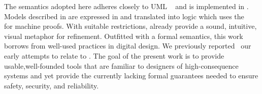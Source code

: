 The semantics adopted here adheres closely to UML \Statecharts~\cite{Alexandre} and is implemented in \iUMLB.
 Models described in \Statecharts are expressed in \SCXML and
 translated into \EventB logic which uses the \Rodin~\cite{abrial10:_rodin} for
 machine proofs. With suitable restrictions, \Statecharts already provide a sound,
intuitive, visual metaphor for refinement. Outfitted with a formal
semantics, this work borrows from well-used \Statechart practices in
digital design.  We previously reported~\cite{Morris_2016} our early 
attempts to relate \Statecharts to \EventB. The goal of the present 
work is to provide usable,well-founded tools that are familiar to 
designers of high-consequence systems and yet provide the currently 
lacking formal guarantees needed to ensure safety, security, and reliability.

%



